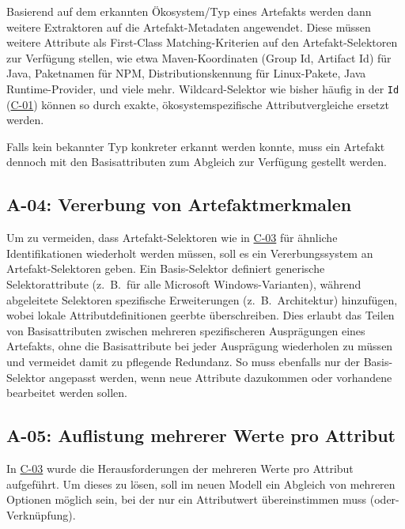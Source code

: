 Basierend auf dem erkannten Ökosystem/Typ eines Artefakts werden dann weitere Extraktoren auf die Artefakt-Metadaten angewendet.
Diese müssen weitere Attribute als First-Class Matching-Kriterien auf den Artefakt-Selektoren zur Verfügung stellen, wie etwa Maven-Koordinaten (Group Id, Artifact Id) für Java, Paketnamen für NPM, Distributionskennung für Linux-Pakete, Java Runtime-Provider, und viele mehr.
Wildcard-Selektor wie bisher häufig in der \texttt{Id} (\hyperref[subsec:c-01-unspezifische-identifikation-von-artefakten]{C-01}) können so durch exakte, ökosystemspezifische Attributvergleiche ersetzt werden.

Falls kein bekannter Typ konkreter erkannt werden konnte, muss ein Artefakt dennoch mit den Basisattributen zum Abgleich zur Verfügung gestellt werden.

\subsection{A-04: Vererbung von Artefaktmerkmalen}\label{subsec:req-selektor-inheritance}

Um zu vermeiden, dass Artefakt-Selektoren wie in \hyperref[subsec:c-03-duplizierte-artefakt-selektoren]{C-03} für ähnliche Identifikationen wiederholt werden müssen, soll es ein Vererbungssystem an Artefakt-Selektoren geben.
Ein Basis-Selektor definiert generische Selektorattribute (z.\ B.\ für alle Microsoft Windows-Varianten), während abgeleitete Selektoren spezifische Erweiterungen (z.\ B.\ Architektur) hinzufügen, wobei lokale Attributdefinitionen geerbte überschreiben.
Dies erlaubt das Teilen von Basisattributen zwischen mehreren spezifischeren Ausprägungen eines Artefakts, ohne die Basisattribute bei jeder Ausprägung wiederholen zu müssen und vermeidet damit zu pflegende Redundanz.
So muss ebenfalls nur der Basis-Selektor angepasst werden, wenn neue Attribute dazukommen oder vorhandene bearbeitet werden sollen.

\subsection{A-05: Auflistung mehrerer Werte pro Attribut}\label{subsec:req-multiple-attribute-values}

In \hyperref[subsec:c-03-duplizierte-artefakt-selektoren]{C-03} wurde die Herausforderungen der mehreren Werte pro Attribut aufgeführt.
Um dieses zu lösen, soll im neuen Modell ein Abgleich von mehreren Optionen möglich sein, bei der nur ein Attributwert übereinstimmen muss (oder-Verknüpfung).

